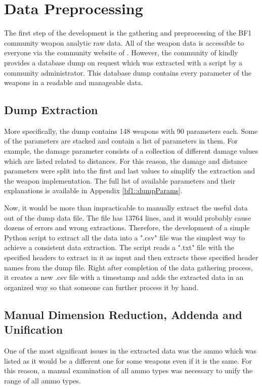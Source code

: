 \documentclass[MGS,Master,english]{twbook}%
\begin{document}
\section{Data Preprocessing} \label{dev::dataPreprocessing}
The first step of the development is the gathering and preprocessing of the \ac{BF1} community weapon analytic raw data. All of the weapon data is accessible to everyone via the community website of \citep{symthic::bf1stats}. However, the community of  kindly provides a database dump on request which was extracted with a script by a community administrator. This database dump contains every parameter of the weapons in a readable and manageable data.

\subsection{Dump Extraction} \label{chapter::dumpExtraction}
More specifically, the dump contains 148 weapons with 90 parameters each. Some of the parameters are stacked and contain a list of parameters in them. For example, the damage parameter consists of a collection of different damage values which are listed related to distances. For this reason, the damage and distance parameters were split into the first and last values to simplify the extraction and the weapon implementation. The full list of available parameters and their explanations is available in Appendix \ref{bf1::dumpParams}.

Now, it would be more than impracticable to manually extract the useful data out of the dump data file. The file has 13764 lines, and it would probably cause dozens of errors and wrong extractions. Therefore, the development of a simple Python script to extract all the data into a ".csv" file was the simplest way to achieve a consistent data extraction. The script reads a ".txt" file with the specified headers to extract in it as input and then extracts these specified header names from the dump file. Right after completion of the data gathering process, it creates a new .csv file with a timestamp and adds the extracted data in an organized way so that someone can further process it by hand.

\subsection{Manual Dimension Reduction, Addenda and Unification}
One of the most significant issues in the extracted data was the ammo which was listed as it would be a different one for some weapons even if it is the same. For this reason, a manual examination of all ammo types was necessary to unify the range of all ammo types. 
\end{document}
